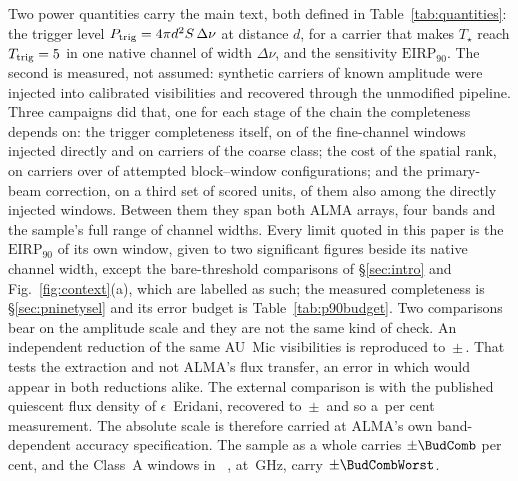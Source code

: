 Two power quantities carry the main text, both defined in
Table~\ref{tab:quantities}: the trigger level $P_{\rm trig} = 4\pi
d^{2}S\,\Delta\nu$ at distance $d$, for a carrier that makes $T_\star$ reach
$T_{\rm trig}=5$ in one native channel of width $\Delta\nu$,
and the sensitivity $\mathrm{EIRP}_{90}$. The second is measured, not
assumed: synthetic carriers of known amplitude were injected into
calibrated visibilities and recovered through the unmodified pipeline.
Three campaigns did that, one for each stage of the chain the completeness
depends on: the trigger completeness itself, on \MkInjCompWin{} of the
\MkInjCompDenom{} fine-channel windows injected directly and on
\SensNToneCoarse{} carriers of the coarse class; the cost of the spatial
rank, on \SelNTone{} carriers over \MkInjSelUnit{} of \MkInjSelTotal{}
attempted block--window configurations; and the primary-beam correction, on a
third set of \MkInjBeamUnit{} scored units, \MkInjBeamShared{} of them also
among the directly injected windows. Between them they span both ALMA arrays,
four bands and the sample's full range of channel widths. Every limit quoted in
this paper is the $\mathrm{EIRP}_{90}$ of its own window, given to two
significant figures beside its native channel width, except the
bare-threshold comparisons of \S\ref{sec:intro} and
Fig.~\ref{fig:context}(a), which are labelled as such; the measured
completeness is \S\ref{sec:pninetysel} and its error
budget is Table~\ref{tab:p90budget}. Two comparisons bear on the amplitude
scale and they are not the same kind of check. An independent reduction of the same AU~Mic visibilities is reproduced to
\PxJanRatio\,$\pm$\,\PxJanRatioErr. That tests the extraction and not
ALMA's flux transfer, an error in which would appear in both reductions
alike. The external comparison is with the published quiescent flux density
of $\epsilon$~Eridani, recovered to
\PxEpsRatio\,$\pm$\,\PxEpsRatioErr{} \citep{Burton2022} and so a
\SbEpsPct\,per cent measurement. The absolute scale is therefore carried at ALMA's own band-dependent
accuracy specification. The sample as a whole carries $\pm\BudComb$ per
cent, and the \BudNHiWin{} Class~A windows in
\BudHiBandWord~\BudHiBands, at \BudHiGHzList\,GHz, carry
$\pm\BudCombWorst$.

